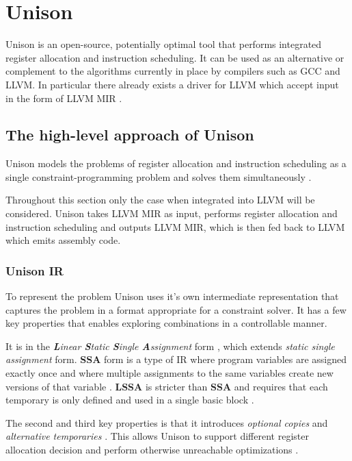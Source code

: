 \section{Unison}
\label{sec:unison}

Unison is an open-source, potentially optimal tool that performs integrated register
allocation and instruction scheduling. It can be used as an alternative or complement to
the algorithms currently in place by compilers such as GCC and LLVM. In particular there
already exists a driver for LLVM which accept input in the form of LLVM MIR \cite{unison-docs}.

\subsection{The high-level approach of Unison}

Unison models the problems of register allocation and instruction scheduling as a single
constraint-programming problem and solves them simultaneously \cite{unison-docs,reg-alloc-inst-sched-uni}.

Throughout this section only the case when integrated into LLVM will be considered. Unison
takes LLVM MIR as input, performs register allocation and instruction scheduling and outputs
LLVM MIR, which is then fed back to LLVM which emits assembly code.

\subsubsection{Unison IR}

To represent the problem Unison uses it's own intermediate representation that captures
the problem in a format appropriate for a constraint solver. It has a few key properties
that enables exploring combinations in a controllable manner.

It is in the \textit{\textbf{L}inear \textbf{S}tatic \textbf{S}ingle \textbf{A}ssignment}
form \cite{reg-alloc-inst-sched-uni}, which extends \textit{static single assignment} form.
\textbf{SSA} form is a type of IR where program variables are assigned exactly once and
where multiple assignments to the same variables create new versions of that variable
\cite{gcc-ssa}. \textbf{LSSA} is stricter than \textbf{SSA} and requires that each temporary
is only defined and used in a single basic block \cite[Section~3.2]{constraint-based}.

The second and third key properties is that it introduces \textit{optional copies} and
\textit{alternative temporaries} \cite{reg-alloc-inst-sched-uni}. This allows Unison to
support different register allocation decision and perform otherwise unreachable optimizations
\cite{reg-alloc-inst-sched-uni, comb-spill}.

